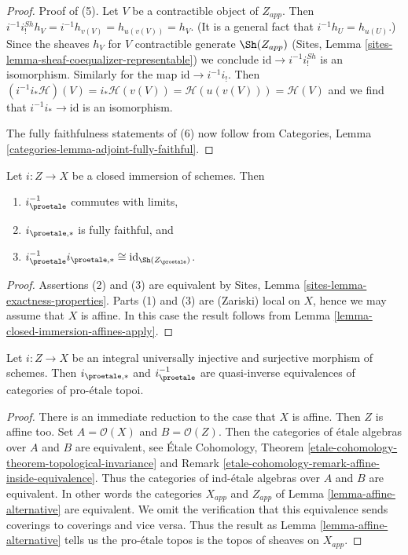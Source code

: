 \begin{proof}
\medskip\noindent
Proof of (5). Let $V$ be a contractible object of $Z_{app}$.
Then $i^{-1}i^{Sh}_!h_V = i^{-1}h_{v(V)} = h_{u(v(V))} = h_V$.
(It is a general fact that $i^{-1}h_U = h_{u(U)}$.) Since the
sheaves $h_V$ for $V$ contractible generate $\Sh(Z_{app})$
(Sites, Lemma \ref{sites-lemma-sheaf-coequalizer-representable})
we conclude $\text{id} \to i^{-1}i^{Sh}_!$ is an isomorphism.
Similarly for the map $\text{id} \to i^{-1}i_!$. Then
$(i^{-1}i_*\mathcal{H})(V) = i_*\mathcal{H}(v(V)) =
\mathcal{H}(u(v(V))) = \mathcal{H}(V)$ and we find that
$i^{-1}i_* \to \text{id}$ is an isomorphism.

\medskip\noindent
The fully faithfulness statements of (6) now follow from
Categories, Lemma \ref{categories-lemma-adjoint-fully-faithful}.
\end{proof}

\begin{lemma}
\label{lemma-closed-immersion}
Let $i : Z \to X$ be a closed immersion of schemes. Then
\begin{enumerate}
\item $i_\proetale^{-1}$ commutes with limits,
\item $i_{\proetale, *}$ is fully faithful, and
\item $i_\proetale^{-1}i_{\proetale, *} \cong \text{id}_{\Sh(Z_\proetale)}$.
\end{enumerate}
\end{lemma}

\begin{proof}
Assertions (2) and (3) are equivalent by
Sites, Lemma \ref{sites-lemma-exactness-properties}.
Parts (1) and (3) are (Zariski) local on $X$, hence we may assume that
$X$ is affine. In this case the result follows from
Lemma \ref{lemma-closed-immersion-affines-apply}.
\end{proof}

\begin{lemma}
\label{lemma-thickening}
Let $i : Z \to X$ be an integral universally injective and surjective morphism
of schemes. Then
$i_{\proetale, *}$ and $i_\proetale^{-1}$ are quasi-inverse
equivalences of categories of pro-\'etale topoi.
\end{lemma}

\begin{proof}
There is an immediate reduction to the case that $X$ is affine.
Then $Z$ is affine too. Set $A = \mathcal{O}(X)$ and $B = \mathcal{O}(Z)$.
Then the categories of \'etale algebras over
$A$ and $B$ are equivalent, see 
\'Etale Cohomology, Theorem
\ref{etale-cohomology-theorem-topological-invariance} and
Remark \ref{etale-cohomology-remark-affine-inside-equivalence}.
Thus the categories of ind-\'etale algebras over $A$ and $B$ are
equivalent. In other words the categories $X_{app}$ and $Z_{app}$
of Lemma \ref{lemma-affine-alternative} are equivalent.
We omit the verification
that this equivalence sends coverings to coverings and vice versa.
Thus the result as Lemma \ref{lemma-affine-alternative}
tells us the pro-\'etale topos is the topos of sheaves on $X_{app}$.
\end{proof}

